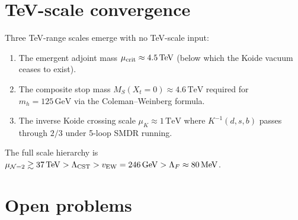 \documentclass[12pt,a4paper]{article}
\newcommand{\MeV}{\,\mathrm{MeV}}
\newcommand{\GeV}{\,\mathrm{GeV}}
\newcommand{\TeV}{\,\mathrm{TeV}}
\begin{document}
\section{TeV-scale convergence}
\label{sec:TeV}

Three TeV-range scales emerge with no TeV-scale input:
\begin{enumerate}
  \item The emergent adjoint mass
    $\mu_{\rm crit} \approx 4.5\TeV$ (below which the Koide
    vacuum ceases to exist).
  \item The composite stop mass $M_S(X_t = 0) \approx 4.6\TeV$
    required for $m_h = 125\GeV$ via the Coleman--Weinberg formula.
  \item The inverse Koide crossing scale
    $\mu_K \approx 1\TeV$ where $K^{-1}(d,s,b)$ passes through
    $2/3$ under 5-loop SMDR running.
\end{enumerate}
The full scale hierarchy is
$\mu_{\mathcal{N}=2} \gtrsim 37\TeV > \Lambda_{\rm CST}
> v_{\rm EW} = 246\GeV > \Lambda_F \approx 80\MeV$.


\section{Open problems}
\label{sec:open}
\end{document}
